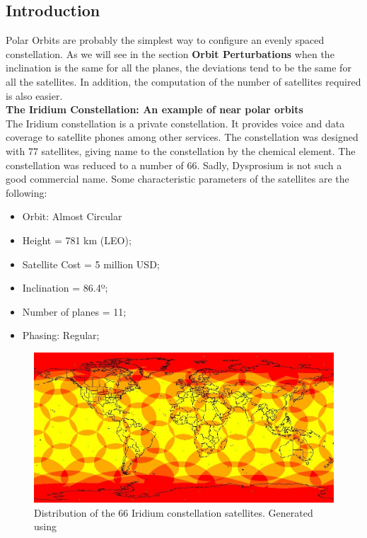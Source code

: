 \subsection{Introduction}
Polar Orbits are probably the simplest way to configure an evenly spaced constellation. As we will see in the section \textbf{Orbit Perturbations} when the inclination is the same for all the planes, the deviations tend to be the same for all the satellites. In addition, the computation of the number of satellites required is also easier.
\\
\textbf{The Iridium Constellation: An example of near polar orbits\cite{Iridium}}
\\
The Iridium constellation is a private constellation. It provides voice and data coverage to satellite phones among other services. The constellation was designed with 77 satellites, giving name to the constellation by the chemical element. The constellation was reduced to a number of 66. Sadly, Dysprosium is not such a good commercial name. Some characteristic parameters of the satellites are the following:

\begin{itemize}
\item Orbit: Almost Circular
\item Height = 781 km (LEO);
\item Satellite Cost = 5 million USD;
\item Inclination = 86.4º;
\item Number of planes = 11;
\item Phasing: Regular;
\end{itemize}

\begin{figure}[H]
\begin{center}
\includegraphics[scale=0.6]{PolarOrbits/Iridium.jpg}
\caption{Distribution of the 66 Iridium constellation satellites. Generated using \cite{SaVi}}
\end{center}
\end{figure} 

